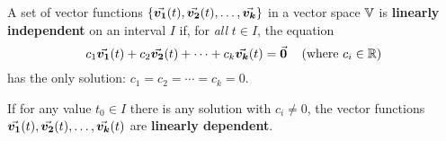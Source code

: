 \documentclass{beamer}
\begin{document}
\begin{frame}
\begin{definition}
A set of vector functions $\left\{{\vec{\boldsymbol{v_1}}}(t),{\vec{\boldsymbol{v_2}}}(t),\dots,{\vec{\boldsymbol{v_k}}}\right\}$ in a vector space $\mathbb{V}$ is \textbf{linearly independent} on an interval $I$ if, for \emph{all} $t\in I$, the equation
\begin{equation*}
c_1{\vec{\boldsymbol{v_1}}}(t)+c_2{\vec{\boldsymbol{v_2}}}(t)+\cdots+c_k{\vec{\boldsymbol{v_k}}}(t)={\vec{\boldsymbol{0}}}\quad\left(\text{where $c_i\in\mathbb{R}$}\right)
\end{equation*}
has the only solution: $c_1=c_2=\cdots=c_k=0$.

\vspace{.5cm}
If for any value $t_0\in I$ there is any solution with $c_i\neq 0$, the vector functions ${\vec{\boldsymbol{v_1}}}(t),{\vec{\boldsymbol{v_2}}}(t),\dots,{\vec{\boldsymbol{v_k}}}(t)$ are \textbf{linearly dependent}.
\end{definition}
\end{frame}
\end{document}
